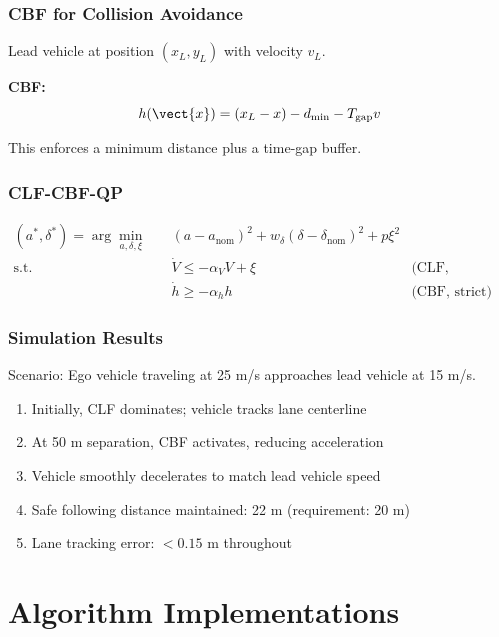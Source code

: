 \subsubsection{CBF for Collision Avoidance}

Lead vehicle at position $(x_L, y_L)$ with velocity $v_L$.

\textbf{CBF:}
\begin{equation}
h(\vect{x}) = (x_L - x) - d_{\min} - T_{\text{gap}} v
\end{equation}

This enforces a minimum distance plus a time-gap buffer.

\subsubsection{CLF-CBF-QP}

\begin{align}
(a^*, \delta^*) = \arg\min_{a, \delta, \xi} \quad & (a - a_{\text{nom}})^2 + w_\delta (\delta - \delta_{\text{nom}})^2 + p\xi^2 \\
\text{s.t.} \quad & \dot{V} \leq -\alpha_V V + \xi \quad &\text{(CLF, relaxable)} \\
& \dot{h} \geq -\alpha_h h \quad &\text{(CBF, strict)}
\end{align}

\subsubsection{Simulation Results}

Scenario: Ego vehicle traveling at 25 m/s approaches lead vehicle at 15 m/s.

\begin{enumerate}
    \item Initially, CLF dominates; vehicle tracks lane centerline
    \item At 50 m separation, CBF activates, reducing acceleration
    \item Vehicle smoothly decelerates to match lead vehicle speed
    \item Safe following distance maintained: 22 m (requirement: 20 m)
    \item Lane tracking error: $<0.15$ m throughout
\end{enumerate}

\section{Algorithm Implementations}
\label{sec:algorithm_implementations}


